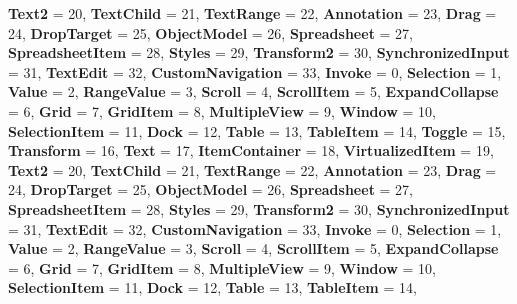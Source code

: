 \begin{DoxyCompactItemize}
{\bfseries Text2} = 20, 
{\bfseries Text\+Child} = 21, 
{\bfseries Text\+Range} = 22, 
{\bfseries Annotation} = 23, 
\newline
{\bfseries Drag} = 24, 
{\bfseries Drop\+Target} = 25, 
{\bfseries Object\+Model} = 26, 
{\bfseries Spreadsheet} = 27, 
\newline
{\bfseries Spreadsheet\+Item} = 28, 
{\bfseries Styles} = 29, 
{\bfseries Transform2} = 30, 
{\bfseries Synchronized\+Input} = 31, 
\newline
{\bfseries Text\+Edit} = 32, 
{\bfseries Custom\+Navigation} = 33, 
{\bfseries Invoke} = 0, 
{\bfseries Selection} = 1, 
\newline
{\bfseries Value} = 2, 
{\bfseries Range\+Value} = 3, 
{\bfseries Scroll} = 4, 
{\bfseries Scroll\+Item} = 5, 
\newline
{\bfseries Expand\+Collapse} = 6, 
{\bfseries Grid} = 7, 
{\bfseries Grid\+Item} = 8, 
{\bfseries Multiple\+View} = 9, 
\newline
{\bfseries Window} = 10, 
{\bfseries Selection\+Item} = 11, 
{\bfseries Dock} = 12, 
{\bfseries Table} = 13, 
\newline
{\bfseries Table\+Item} = 14, 
{\bfseries Toggle} = 15, 
{\bfseries Transform} = 16, 
{\bfseries Text} = 17, 
\newline
{\bfseries Item\+Container} = 18, 
{\bfseries Virtualized\+Item} = 19, 
{\bfseries Text2} = 20, 
{\bfseries Text\+Child} = 21, 
\newline
{\bfseries Text\+Range} = 22, 
{\bfseries Annotation} = 23, 
{\bfseries Drag} = 24, 
{\bfseries Drop\+Target} = 25, 
\newline
{\bfseries Object\+Model} = 26, 
{\bfseries Spreadsheet} = 27, 
{\bfseries Spreadsheet\+Item} = 28, 
{\bfseries Styles} = 29, 
\newline
{\bfseries Transform2} = 30, 
{\bfseries Synchronized\+Input} = 31, 
{\bfseries Text\+Edit} = 32, 
{\bfseries Custom\+Navigation} = 33, 
\newline
{\bfseries Invoke} = 0, 
{\bfseries Selection} = 1, 
{\bfseries Value} = 2, 
{\bfseries Range\+Value} = 3, 
\newline
{\bfseries Scroll} = 4, 
{\bfseries Scroll\+Item} = 5, 
{\bfseries Expand\+Collapse} = 6, 
{\bfseries Grid} = 7, 
\newline
{\bfseries Grid\+Item} = 8, 
{\bfseries Multiple\+View} = 9, 
{\bfseries Window} = 10, 
{\bfseries Selection\+Item} = 11, 
\newline
{\bfseries Dock} = 12, 
{\bfseries Table} = 13, 
{\bfseries Table\+Item} = 14, 

\end{DoxyCompactItemize}
